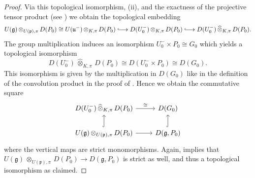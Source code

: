 \documentclass[a4paper, reqno, 10pt]{amsart}
\theoremstyle{definition}
\numberwithin{equation}{section}
\newcommand{\botimes}[1]{{\,\otimes_{#1}\,}}
\newcommand{\projotimes}{{\,\otimes_{K,\pi}\,}}
\newcommand{\projcotimes}{{\,\widehat{\otimes}_{K,\pi}\,}}
\newcommand{\ra}{\rightarrow}
\newcommand{\Fg}{{\mathfrak {g}}}
\newcommand{\Fp}{{\mathfrak {p}}}
\newcommand{\Fu}{{\mathfrak {u}}}
\DeclareRobustCommand\longhookrightarrow
{\lhook\joinrel\longrightarrow}
\begin{document}
\begin{proof}
	
	Via this topological isomorphism,  (ii), and the exactness of the projective tensor product (see \cite[Lemma 2.1 (ii)]{BreuilHerzig18TowardsFinSlopePartGLn}) we obtain the topological embedding
	\begin{equation*}
		U(\Fg) \botimes{U(\Fp),\pi} D(P_0) \cong U(\Fu^-) \botimes{K,\pi} D(P_0) \longhookrightarrow D(U^-_0) \projotimes D(P_0) \longhookrightarrow D(U^-_0) \projcotimes D(P_0) .
	\end{equation*}
	The group multiplication induces an isomorphism $U^-_0 \times P_0 \cong G_0$ which yields a topological isomorphism
	\begin{equation*}
		D(U^-_0) \projcotimes D(P_0) \cong	D(U^-_0 \times P_0) \cong D(G_0) .
	\end{equation*}
	This isomorphism is given by the multiplication in $D(G_0)$	like in the definition of the convolution product in the proof of .
	Hence we obtain the commutative square
	\begin{equation*}
		\begin{tikzcd}
			D(U^-_0) \projcotimes D(P_0) \ar[r, "\cong"] & D(G_0) \\
			U(\Fg) \botimes{U(\Fp),\pi} D(P_0) \ar[r] \ar[u, hookrightarrow] & D(\Fg,P_0) \ar[u, hookrightarrow]
		\end{tikzcd}
	\end{equation*}
	where the vertical maps are strict monomorphisms.
	Again, \cite[Lemma 2]{KopylovKuzminov00KerCokerSeqSemiAbCat} implies that $U(\Fg) \botimes{U(\Fp),\pi} D(P_0) \ra D(\Fg,P_0)$ is strict as well, and thus a topological isomorphism as claimed.	
\end{proof}
\end{document}
